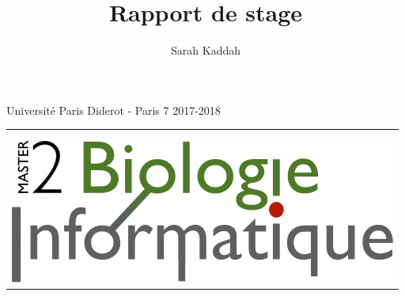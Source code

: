 \documentclass[12pt,a4paper]{article}
\author{Sarah Kaddah}
\title{Rapport de stage}
\begin{document}
	\begin{titlepage}
	\begin{sffamily}
	\begin{center}
	\large{Université Paris Diderot - Paris 7 \hfill 2017-2018} \bigskip
	\begin{tabular}{c}
		\\ \\ \\
		\includegraphics[scale=0.3]{img/m2.png}
	\end{tabular}
	\hfill
	\begin{tabular}{c}
		\\

\end{tabular}
\end{center}
\end{sffamily}
\end{titlepage}
\end{document}
